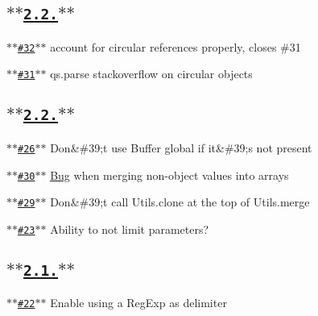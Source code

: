 \subsection*{\href{https://github.com/hapijs/qs/issues?milestone=10&state=closed}{\tt $\ast$$\ast$2.2.$\ast$$\ast$}}


\begin{DoxyItemize}
\item \href{https://github.com/hapijs/qs/issues/32}{\tt $\ast$$\ast$\#32$\ast$$\ast$} account for circular references properly, closes \#31
\item \href{https://github.com/hapijs/qs/issues/31}{\tt $\ast$$\ast$\#31$\ast$$\ast$} qs.\+parse stackoverflow on circular objects
\end{DoxyItemize}

\subsection*{\href{https://github.com/hapijs/qs/issues?milestone=9&state=closed}{\tt $\ast$$\ast$2.2.$\ast$$\ast$}}


\begin{DoxyItemize}
\item \href{https://github.com/hapijs/qs/issues/26}{\tt $\ast$$\ast$\#26$\ast$$\ast$} Don\&\#39;t use Buffer global if it\&\#39;s not present
\item \href{https://github.com/hapijs/qs/issues/30}{\tt $\ast$$\ast$\#30$\ast$$\ast$} \hyperlink{class_bug}{Bug} when merging non-\/object values into arrays
\item \href{https://github.com/hapijs/qs/issues/29}{\tt $\ast$$\ast$\#29$\ast$$\ast$} Don\&\#39;t call Utils.\+clone at the top of Utils.\+merge
\item \href{https://github.com/hapijs/qs/issues/23}{\tt $\ast$$\ast$\#23$\ast$$\ast$} Ability to not limit parameters?
\end{DoxyItemize}

\subsection*{\href{https://github.com/hapijs/qs/issues?milestone=8&state=closed}{\tt $\ast$$\ast$2.1.$\ast$$\ast$}}


\begin{DoxyItemize}
\item \href{https://github.com/hapijs/qs/issues/22}{\tt $\ast$$\ast$\#22$\ast$$\ast$} Enable using a Reg\+Exp as delimiter
\end{DoxyItemize}

